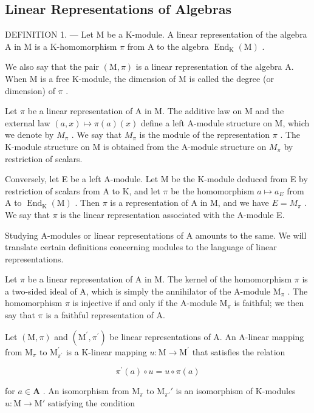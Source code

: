 \subsection{Linear Representations of Algebras}

DEFINITION 1. --- Let M be a K-module. A linear representation of the algebra A in M is a K-homomorphism \(\pi\) from A to the algebra \(\operatorname{End}_{\mathrm{K}}(\mathrm{M})\) .

We also say that the pair \((\mathrm{M},\pi)\) is a linear representation of the algebra A. When M is a free K-module, the dimension of M is called the degree (or dimension) of \(\pi\) .

Let \(\pi\) be a linear representation of A in M. The additive law on M and the external law \((a,x)\mapsto\pi(a)(x)\) define a left A-module structure on M, which we denote by \(M_{\pi}\) . We say that \(M_{\pi}\) is the module of the representation \(\pi\) . The K-module structure on M is obtained from the A-module structure on \(M_{\pi}\) by restriction of scalars.

Conversely, let E be a left A-module. Let M be the K-module deduced from E by restriction of scalars from A to K, and let \(\pi\) be the homomorphism \(a \mapsto a_{E}\) from A to \(\operatorname{End}_{\mathrm{K}}(\mathrm{M})\) . Then \(\pi\) is a representation of A in M, and we have \(E = M_{\pi}\) . We say that \(\pi\) is the linear representation associated with the A-module E.

Studying A-modules or linear representations of A amounts to the same. We will translate certain definitions concerning modules to the language of linear representations.

Let \(\pi\) be a linear representation of A in M. The kernel of the homomorphism \(\pi\) is a two-sided ideal of A, which is simply the annihilator of the A-module \(\mathrm{M}_{\pi}\) . The homomorphism \(\pi\) is injective if and only if the A-module \(\mathrm{M}_{\pi}\) is faithful; we then say that \(\pi\) is a faithful representation of A.

Let \((\mathrm{M},\pi)\) and \((\mathrm{M}^{\prime},\pi^{\prime})\) be linear representations of A. An A-linear mapping from \(\mathrm{M}_{\pi}\) to \(\mathrm{M}_{\pi^{\prime}}^{\prime}\) is a K-linear mapping \(u:\mathrm{M}\to\mathrm{M}^{\prime}\) that satisfies the relation

\[
\pi^ {\prime} (a) \circ u = u \circ \pi (a)\tag{1}
\]

for \(a \in \mathbf{A}\) . An isomorphism from \(\mathrm{M}_{\pi}\) to \(\mathrm{M}_{\pi'}'\) is an isomorphism of K-modules \(u: \mathrm{M} \to \mathrm{M}'\) satisfying the condition

